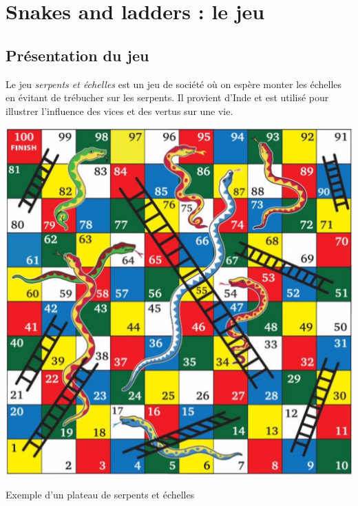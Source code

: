 
\section*{Snakes and ladders : le jeu}



\subsection*{Présentation du jeu}

Le jeu \emph{serpents et échelles} est un jeu de société où on espère monter les échelles en évitant de trébucher sur les serpents. Il provient d'Inde et est utilisé pour illustrer l'influence des vices et des vertus sur une vie.

\begin{marginfigure}%
		\includegraphics[width=\linewidth]{snakesAndLadders.png}
	\caption{Exemple d'un plateau de serpents et échelles}
	\label{fig:1}
\end{marginfigure}

